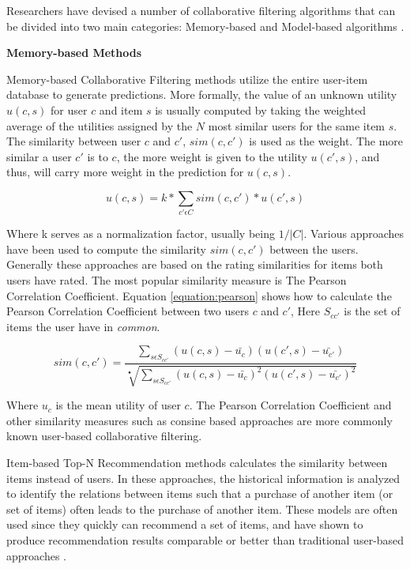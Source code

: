 Researchers have devised a number of collaborative filtering algorithms that can be divided into two main categories: Memory-based and Model-based algorithms \cite{Su2009}.

\textbf{Memory-based Methods}

Memory-based Collaborative Filtering methods utilize the entire user-item database to generate predictions. More formally, the value of an unknown utility $u(c,s)$ for user $c$ and item $s$ is usually computed by taking the weighted average of the utilities assigned by the $N$ most similar users for the same item $s$. The similarity between user $c$ and $c'$, $sim(c, c')$ is used as the weight. The more similar a user $c'$ is to $c$, the more weight is given to the utility $u(c', s)$, and thus, will carry more weight in the prediction for $u(c,s)$.

\begin{equation}
\label{equation:cfratingprediction}
u(c,s) = k * \sum_{c' \epsilon C} sim(c, c') * u(c',s)
\end{equation}

Where k serves as a normalization factor, usually being $1/|C|$. Various approaches have been used to compute the similarity $sim(c, c')$ between the users. Generally these approaches are based on the rating similarities for items both users have rated. The most popular similarity measure is The Pearson Correlation Coefficient. Equation \ref{equation:pearson} shows how to calculate the Pearson Correlation Coefficient between two users $c$ and $c'$, Here $S_{cc'}$ is the set of items the user have in \emph{common}.

\begin{equation}
sim(c, c') = \frac{\sum_{s \epsilon S_{cc'}} (u(c, s)-\bar{u_{c}})(u(c',s)-\bar{u_{c'}})}{\sqrt[•]{\sum_{s \epsilon S_{cc'}} (u(c, s)-\bar{u_{c}})^{2}(u(c',s)-\bar{u_{c'}})^{2}}}
\end{equation}

Where $u_{c}$ is the mean utility of user $c$. The Pearson Correlation Coefficient and other similarity measures such as consine based approaches are more commonly known user-based collaborative filtering.

Item-based Top-N Recommendation methods calculates the similarity between items instead of users. In these approaches, the historical information is analyzed to identify the relations between items such that a purchase of another item (or set of items) often leads to the purchase of another item. These models are often used since they quickly can recommend a set of items, and have shown to produce recommendation results comparable or better than traditional user-based approaches \cite{Karypis2001}.

